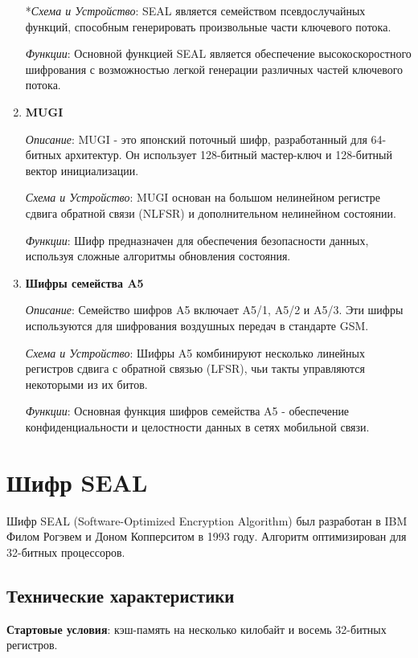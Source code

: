 \documentclass[colorthm]{../civarticle}
\begin{document}
\begin{enumerate}
*\textit{Схема и Устройство}: SEAL является семейством псевдослучайных функций, способным генерировать произвольные части ключевого потока.

\textit{Функции}: Основной функцией SEAL является обеспечение высокоскоростного шифрования с возможностью легкой генерации различных частей ключевого потока.


\item \textbf{MUGI ~\cite{Mugi} }

\textit{Описание}: MUGI - это японский поточный шифр, разработанный для 64-битных архитектур. Он использует 128-битный мастер-ключ и 128-битный вектор инициализации.

\textit{Схема и Устройство}: MUGI основан на большом нелинейном регистре сдвига обратной связи (NLFSR) и дополнительном нелинейном состоянии.

\textit{Функции}: Шифр предназначен для обеспечения безопасности данных, используя сложные алгоритмы обновления состояния.

\item \textbf{Шифры семейства A5 ~\cite{A5} }

\textit{Описание}: Семейство шифров A5 включает A5/1, A5/2 и A5/3. Эти шифры используются для шифрования воздушных передач в стандарте GSM.

\textit{Схема и Устройство}: Шифры A5 комбинируют несколько линейных регистров сдвига с обратной связью (LFSR), чьи такты управляются некоторыми из их битов.

\textit{Функции}: Основная функция шифров семейства A5 - обеспечение конфиденциальности и целостности данных в сетях мобильной связи.

\end{enumerate}


\section{Шифр SEAL}

Шифр SEAL (Software-Optimized Encryption Algorithm) был разработан в IBM Филом Рогэвем и Доном Копперситом в 1993 году. Алгоритм оптимизирован для 32-битных процессоров. ~\cite{Handbook}


\subsection{Технические характеристики}

\textbf{Стартовые условия}: кэш-память на несколько килобайт и восемь 32-битных регистров.
\end{document}
